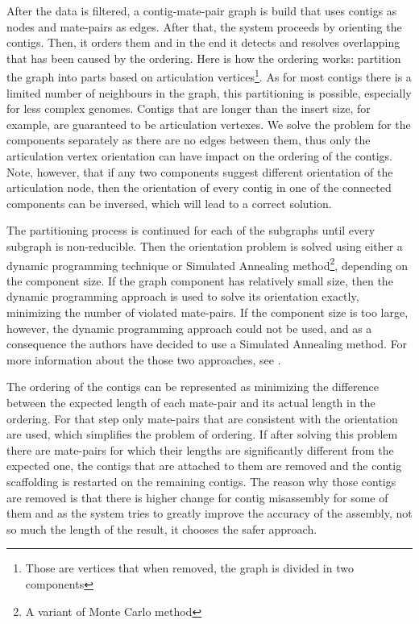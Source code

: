 \documentclass[11pt]{article}
\begin{document}
After the data is filtered, a contig-mate-pair graph is build that uses contigs
as nodes and mate-pairs as edges. After that, the system proceeds by orienting
the contigs. Then, it orders them and in the end it detects and resolves
overlapping that has been caused by the ordering. Here is how the ordering
works: partition the graph into parts based on articulation
vertices\footnote{Those are vertices that when removed, the graph is divided in
two components}. As for most contigs there is a limited number of neighbours in
the graph, this partitioning is possible, especially for less complex genomes.
Contigs that are longer than the insert size, for example, are guaranteed to be
articulation vertexes. We solve the problem for the components separately as
there are no edges between them, thus only the articulation vertex orientation
can have impact on the ordering of the contigs. Note, however, that if any two
components suggest different orientation of the articulation node, then the
orientation of every contig in one of the connected components can be inversed,
which will lead to a correct solution.

The partitioning process is continued for each of the subgraphs until every
subgraph is non-reducible. Then the orientation problem is solved using either a
dynamic programming technique or Simulated Annealing method\footnote{A variant
of Monte Carlo method}, depending on the component size. If the graph component
has relatively small size, then the dynamic programming approach is used to
solve its orientation exactly, minimizing the number of violated mate-pairs. If
the component size is too large, however, the dynamic programming approach could
not be used, and as a consequence the authors have decided to use a Simulated
Annealing method. For more information about the those two approaches, see
\cite{SOPRA}.

The ordering of the contigs can be represented as minimizing the difference
between the expected length of each mate-pair and its actual length in the
ordering. For that step only mate-pairs that are consistent with the orientation
are used, which simplifies the problem of ordering. If after solving this
problem there are mate-pairs for which their lengths are significantly different
from the expected one, the contigs that are attached to them are removed and the
contig scaffolding is restarted on the remaining contigs. The reason why those
contigs are removed is that there is higher change for contig misassembly for
some of them and as the system tries to greatly improve the accuracy of the
assembly, not so much the length of the result, it chooses the safer approach.
\end{document}
